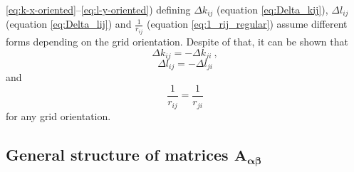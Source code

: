\documentclass[manuscript]{geophysics}
\begin{document}
	\ref{eq:k-x-oriented}--\ref{eq:l-y-oriented}) defining $\Delta k_{ij}$ (equation
	\ref{eq:Delta_kij}), $\Delta l_{ij}$ (equation \ref{eq:Delta_lij}) and 
	$\tfrac{1}{r_{ij}}$ (equation \ref{eq:1_rij_regular}) assume different 
	forms depending on the grid orientation.
	Despite of that, it can be shown that
	\begin{equation}
		\Delta k_{ij} = - \Delta k_{ji} \: ,
		\label{eq:Delta_kij_symmetry}
	\end{equation}
	\begin{equation}
		\Delta l_{ij} = - \Delta l_{ji}
		\label{eq:Delta_lij_symmetry}
	\end{equation}
	and 
	\begin{equation}
		\frac{1}{r_{ij}} = \frac{1}{r_{ji}}
		\label{eq:1_rij_symmetry}
	\end{equation}
	for any grid orientation.
	
	\subsection{General structure of matrices $\mathbf{A_{\boldsymbol{\alpha\beta}}}$}
	
\end{document}
